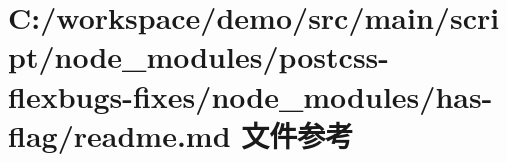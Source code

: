 \hypertarget{node__modules_2postcss-flexbugs-fixes_2node__modules_2has-flag_2_r_e_a_d_m_e_8md}{}\section{C\+:/workspace/demo/src/main/script/node\+\_\+modules/postcss-\/flexbugs-\/fixes/node\+\_\+modules/has-\/flag/readme.md 文件参考}
\label{node__modules_2postcss-flexbugs-fixes_2node__modules_2has-flag_2_r_e_a_d_m_e_8md}
